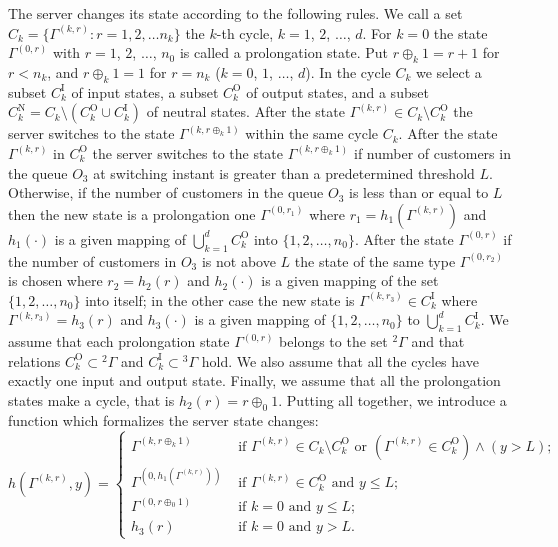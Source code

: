 \documentclass[runningheads,a4paper]{llncs}
\begin{document}
The server changes its state according to the following rules. We call a set $C_k = \{\Gamma^{(k,r)}
\colon r=1,2,\ldots n_k\}$ the $k$-th cycle, $k=1$, $2$, $\ldots$, $d$. For $k=0$ the state
$\Gamma^{(0,r)}$ with $r=1$, $2$, $\ldots$, $n_0$ is called a prolongation state. Put $r \oplus_k 1
= r+1$ for $r<n_k$, and $r \oplus_k 1 = 1$ for $r=n_k$ ($k = 0$, $1$, $\ldots$, $d$). In the cycle
$C_k$ we select a subset $C_k^{\mathrm{I}}$ of input states, a subset $C_k^{\mathrm{O}}$ of output
states, and a subset $C_k^{\mathrm{N}} = C_k \setminus (C_k^{\mathrm{O}} \cup C_k^{\mathrm{I}})$ of
neutral states.  After the state $\Gamma^{(k,r)} \in C_k\setminus C_k^{\mathrm{O}}$ the server
switches to the state $\Gamma^{(k,r \oplus_k 1)}$ within the same cycle $C_k$.  After the state
$\Gamma^{(k,r)}$ in $C_k^{\mathrm{O}}$ the server switches to the state $\Gamma^{(k,r \oplus_k 1)}$
if number of customers in the queue $O_3$ at switching instant is greater than a predetermined
threshold $L$.  Otherwise, if the number of customers in the queue $O_3$ is less than or equal to $L$
then the new state is a prolongation one $\Gamma^{(0,r_1)}$ where $r_1=h_1(\Gamma^{(k,r)})$ and
$h_1(\cdot)$ is a given mapping of $\bigcup_{k=1}^d C_k^{\mathrm{O}}$ into $\{1,2,\ldots,
n_0\}$.  After the state $\Gamma^{(0,r)}$ if the number of customers in $O_3$ is not above $L$ the
state of the same type $\Gamma^{(0,r_2)}$ is chosen where $r_2=h_2(r)$ and $h_2(\cdot)$ is a given
mapping of the set $\{1,2, \ldots, n_0\}$ into itself; in the other case the new state is
$\Gamma^{(k,r_3)} \in C_k^{\mathrm{I}}$ where $\Gamma^{(k,r_3)}=h_3(r)$ and $h_3(\cdot)$ is a 
given mapping of  $\{1,2, \ldots, n_0\}$ to $\bigcup_{k=1}^d C_k^{\mathrm{I}}$. We assume
that each prolongation state $\Gamma^{(0,r)}$ belongs to the set ${}^2 \Gamma$ and that relations
$C_k^\mathrm{O}\subset {}^2 \Gamma$ and $C_k^\mathrm{I}\subset {}^3 \Gamma$ hold. We also assume
that all the cycles have exactly one input and output state. Finally, we assume that all the
prolongation states make a cycle, that is  $h_2(r)=r\oplus_0 1$. Putting all together, we introduce
a function which formalizes the server state changes:
\begin{equation}
h(\Gamma^{(k,r)},y) = 
\begin{cases}
\Gamma^{(k,r \oplus_k 1)}&  \text{ if  $\Gamma^{(k,r)}\in C_k\setminus C_k^{\mathrm{O}}$ or $(\Gamma^{(k,r)}\in C_k^{\mathrm{O}}) \wedge (y>L)$;}\\
\Gamma^{(0,h_1(\Gamma^{(k,r)}))}&  \text{ if  $\Gamma^{(k,r)}\in C_k^{\mathrm{O}}$ and $y\leqslant L$;}\\
\Gamma^{(0,r \oplus_0 1)}&  \text{ if $k=0$ and $y\leqslant L$;}\\
h_3(r)&  \text{ if  $k=0$ and $y > L$.}
\end{cases}
\label{hLaw}
\end{equation}
\end{document}
